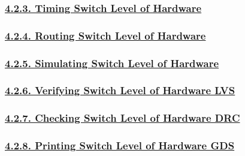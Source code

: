 \documentclass[
]{article}
\begin{document}
\hypertarget{timing-switch-level-of-hardware}{%
\subsubsection{\texorpdfstring{\protect\hyperlink{timing-switch-level-of-hardware-1}{4.2.3.
Timing Switch Level of
Hardware}}{4.2.3. Timing Switch Level of Hardware}}\label{timing-switch-level-of-hardware}}

\hypertarget{routing-switch-level-of-hardware}{%
\subsubsection{\texorpdfstring{\protect\hyperlink{routing-switch-level-of-hardware-1}{4.2.4.
Routing Switch Level of
Hardware}}{4.2.4. Routing Switch Level of Hardware}}\label{routing-switch-level-of-hardware}}

\hypertarget{simulating-switch-level-of-hardware}{%
\subsubsection{\texorpdfstring{\protect\hyperlink{simulating-switch-level-of-hardware-1}{4.2.5.
Simulating Switch Level of
Hardware}}{4.2.5. Simulating Switch Level of Hardware}}\label{simulating-switch-level-of-hardware}}

\hypertarget{verifying-switch-level-of-hardware-lvs}{%
\subsubsection{\texorpdfstring{\protect\hyperlink{verifying-switch-level-of-hardware-lvs-1}{4.2.6.
Verifying Switch Level of Hardware
LVS}}{4.2.6. Verifying Switch Level of Hardware LVS}}\label{verifying-switch-level-of-hardware-lvs}}

\hypertarget{checking-switch-level-of-hardware-drc}{%
\subsubsection{\texorpdfstring{\protect\hyperlink{checking-switch-level-of-hardware-drc-1}{4.2.7.
Checking Switch Level of Hardware
DRC}}{4.2.7. Checking Switch Level of Hardware DRC}}\label{checking-switch-level-of-hardware-drc}}

\hypertarget{printing-switch-level-of-hardware-gds}{%
\subsubsection{\texorpdfstring{\protect\hyperlink{printing-switch-level-of-hardware-gds-1}{4.2.8.
Printing Switch Level of Hardware
GDS}}{4.2.8. Printing Switch Level of Hardware GDS}}\label{printing-switch-level-of-hardware-gds}}
\end{document}
